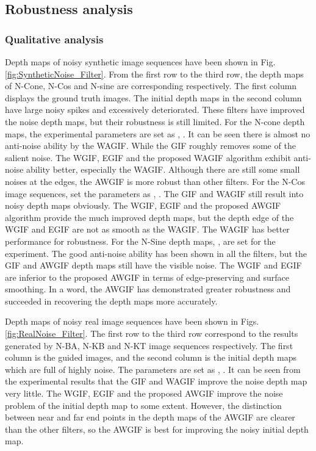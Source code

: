 \documentclass[a4paper,fleqn]{cas-dc}
\begin{document}
\subsection{Robustness analysis}\label{Robustness}

\subsubsection{Qualitative analysis}\label{QualitativeRo}
Depth maps of noisy synthetic image sequences have been shown in Fig. \ref{fig:SyntheticNoise_Filter}. From the first row to the third row, the depth maps of N-Cone, N-Cos and N-sine are corresponding respectively. The first column displays the ground truth images. The initial depth maps in the second column have large noisy spikes and excessively deteriorated. These filters have improved the noise depth maps, but their robustness is still limited. For the N-cone depth maps, the experimental parameters are set as , . It can be seen there is almost no anti-noise ability by the WAGIF. While the GIF roughly removes some of the salient noise. The WGIF, EGIF and the proposed WAGIF algorithm exhibit anti-noise ability better, especially the WAGIF. Although there are still some small noises at the edges, the AWGIF is more robust than other filters. For the N-Cos image sequences, set the parameters as , . The GIF and WAGIF still result into noisy depth maps obviously. The WGIF, EGIF and the proposed AWGIF algorithm provide the much improved depth maps, but the depth edge of the WGIF and EGIF are not as smooth as the WAGIF. The WAGIF has better performance for robustness. For the N-Sine depth maps, ,  are set for the experiment. The good anti-noise ability has been shown in all the filters, but the GIF and AWGIF depth maps still have the visible noise. The WGIF and EGIF are inferior to the proposed AWGIF in terms of edge-preserving and surface smoothing. In a word, the AWGIF has demonstrated greater robustness and succeeded in recovering the depth maps more accurately. 

Depth maps of noisy real image sequences have been shown in Figs. \ref{fig:RealNoise_Filter}. The first row to the third row correspond to the results generated by N-BA, N-KB and N-KT image sequences respectively. The first column is the guided images, and the second column is the initial depth maps which are full of highly noise. The parameters are set as , . It can be seen from the experimental results that the GIF and WAGIF improve the noise depth map very little. The WGIF, EGIF and the proposed AWGIF improve the noise problem of the initial depth map to some extent. However, the distinction between near and far end points in the depth maps of the AWGIF are clearer than the other filters, so the AWGIF is best for improving the noisy initial depth map. 
\end{document}

